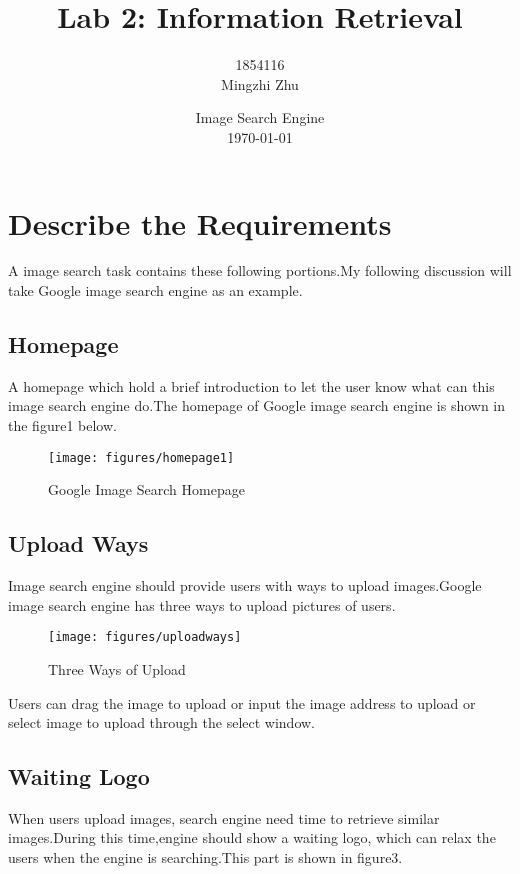 \documentclass{hci}
\title{Lab 2: Information Retrieval}
\author{1854116 \\Mingzhi Zhu}
\date{Image Search Engine\\\today}
\begin{document}
\maketitle
\tableofcontents
\newpage
\section{Describe the Requirements}
A image search task contains these following portions.My following discussion will take Google image search engine as an example.
\subsection{Homepage}
A homepage which hold a brief introduction to let the user know what can this image search engine do.The homepage of Google image search engine is shown in the figure1 below.

\begin{figure}[htbp]
	\centering
	\texttt{[image: figures/homepage1]}
	\caption{Google Image Search Homepage}
	\label{fig:homepage}
\end{figure}

\subsection{Upload Ways}
Image search engine should provide users with ways to upload images.Google image search engine has three ways to upload pictures of users.
\begin{figure}[htbp]
	\centering
	\texttt{[image: figures/uploadways]}
	\caption{Three Ways of Upload}
	\label{fig:uploadways}
\end{figure}
Users can drag the image to upload or input the image address to upload or select image to upload through the select window.

\subsection{Waiting Logo}
When users upload images, search engine need time to retrieve similar images.During this time,engine should show a waiting logo, which can relax the users when the engine is searching.This part is shown in figure3.
\end{document}
